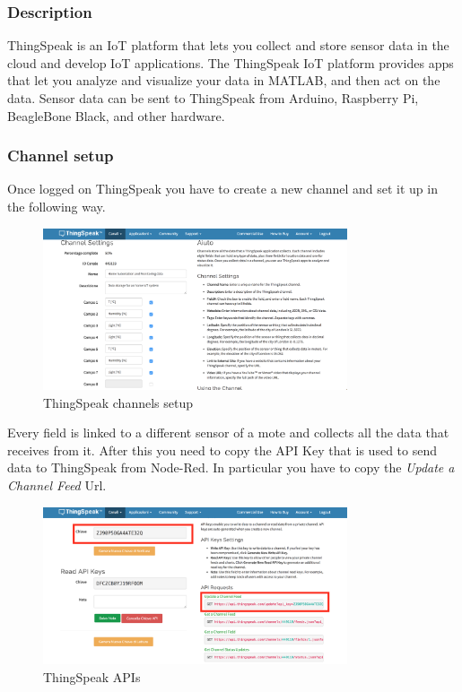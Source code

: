\subsubsection{Description}
ThingSpeak  is an IoT platform that lets you collect and store sensor data in the cloud and develop IoT applications. The ThingSpeak IoT platform provides apps that let you analyze and visualize your data in MATLAB, and then act on the data. Sensor data can be sent to ThingSpeak from Arduino, Raspberry Pi, BeagleBone Black, and other hardware.

\subsubsection{Channel setup}
Once logged on ThingSpeak you have to create a new channel and set it up in the following way.

\begin{figure}[H]
	\begin{center}
		\includegraphics[width=0.8\textwidth]{./pictures/thingspeak-channels-setup}
		\caption{ThingSpeak channels setup}
		\label{mqtt_functioning}
	\end{center}
\end{figure}

\noindent
Every field is linked to a different sensor of a mote and collects all the data that receives from it.
\newline
\newline
After this you need to copy the API Key that is used to send data to ThingSpeak from Node-Red.
\newline
In particular you have to copy the \emph{Update a Channel Feed} Url.

\begin{figure}[H]
	\begin{center}
		\includegraphics[width=0.8\textwidth]{./pictures/thingspeak-apis}
		\caption{ThingSpeak APIs}
		\label{mqtt_functioning}
	\end{center}
\end{figure}

